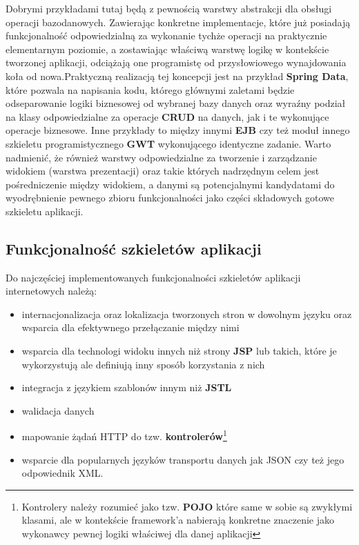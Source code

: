 	Dobrymi przykładami tutaj będą z pewnością warstwy abstrakcji dla obsługi operacji bazodanowych. Zawierając konkretne implementacje, które już posiadają funkcjonalność odpowiedzialną za wykonanie tychże operacji na praktycznie elementarnym poziomie, a zostawiając właściwą warstwę logikę w kontekście tworzonej aplikacji, odciążają one programistę od przysłowiowego wynajdowania koła od nowa.Praktyczną realizacją tej koncepcji jest na przykład \textbf{Spring Data}, które pozwala na napisania kodu, którego głównymi zaletami będzie odseparowanie logiki biznesowej od wybranej bazy danych oraz wyraźny podział na klasy odpowiedzialne za operacje \textbf{CRUD} na danych, jak i te wykonujące operacje biznesowe. Inne przykłady to między innymi \textbf{EJB} czy też moduł innego szkieletu programistycznego \textbf{GWT} wykonującego identyczne zadanie. Warto nadmienić, że również warstwy odpowiedzialne za tworzenie i zarządzanie widokiem (warstwa prezentacji) oraz takie których nadrzędnym celem jest pośredniczenie między widokiem, a danymi są potencjalnymi kandydatami do wyodrębnienie pewnego zbioru funkcjonalności jako części składowych gotowe szkieletu aplikacji. 
	
	\subsection{Funkcjonalność szkieletów aplikacji}
		Do najczęściej implementowanych funkcjonalności szkieletów aplikacji internetowych należą:
		\begin{itemize}
			\item internacjonalizacja oraz lokalizacja tworzonych stron w dowolnym języku oraz wsparcia dla efektywnego przełączanie między nimi
			\item wsparcia dla technologi widoku innych niż strony \textbf{JSP} lub takich, które je wykorzystują ale definiują inny sposób korzystania z nich
			\item integracja z językiem szablonów innym niż \textbf{JSTL}
			\item walidacja danych
			\item mapowanie żądań HTTP do tzw. \textbf{kontrolerów}\footnote{Kontrolery należy rozumieć jako tzw. \textbf{POJO} które same w sobie są zwykłymi klasami, ale w kontekście framework'a nabierają konkretne znaczenie jako wykonawcy pewnej logiki właściwej dla danej aplikacji}
			\item wsparcie dla popularnych języków transportu danych jak JSON czy też jego odpowiednik XML. 
		\end{itemize}
	
